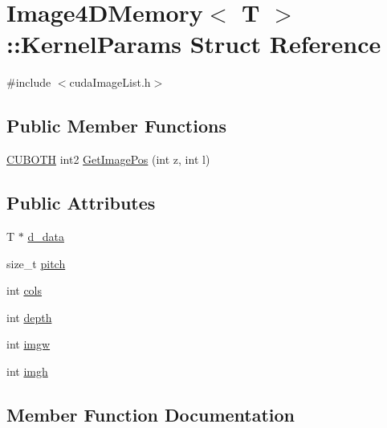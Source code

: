 \hypertarget{struct_image4_d_memory_1_1_kernel_params}{}\section{Image4\+D\+Memory$<$ T $>$\+:\+:Kernel\+Params Struct Reference}
\label{struct_image4_d_memory_1_1_kernel_params}


{\ttfamily \#include $<$cuda\+Image\+List.\+h$>$}

\subsection*{Public Member Functions}
\begin{DoxyCompactItemize}
\item 
\hyperlink{gpu__utils_8h_ac50b87a58396e77c6168aa6f3be3c189}{C\+U\+B\+O\+TH} int2 \hyperlink{struct_image4_d_memory_1_1_kernel_params_ab17ae55e8bc2fe7d01b2e3e364cfdd2a}{Get\+Image\+Pos} (int z, int l)
\end{DoxyCompactItemize}
\subsection*{Public Attributes}
\begin{DoxyCompactItemize}
\item 
T $\ast$ \hyperlink{struct_image4_d_memory_1_1_kernel_params_ab938c44c035ecfd8ebdcf2e799392214}{d\+\_\+data}
\item 
size\+\_\+t \hyperlink{struct_image4_d_memory_1_1_kernel_params_a9ec3499adf40c6b9538dbd81149dc3ea}{pitch}
\item 
int \hyperlink{struct_image4_d_memory_1_1_kernel_params_ab0645fa45e43206965496ca17eb86723}{cols}
\item 
int \hyperlink{struct_image4_d_memory_1_1_kernel_params_a9b5896a9e13cdd7f2c628b2a52d5c880}{depth}
\item 
int \hyperlink{struct_image4_d_memory_1_1_kernel_params_aa622909a1be6fbeefc4d05378433f289}{imgw}
\item 
int \hyperlink{struct_image4_d_memory_1_1_kernel_params_a0a6639d306e4ed5593c5d497edf6fda6}{imgh}
\end{DoxyCompactItemize}


\subsection{Member Function Documentation}
